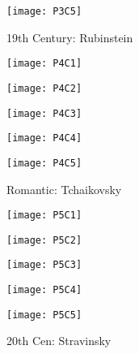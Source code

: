\begin{figure}[h]
\caption{19th Century: Rubinstein}
\centering
\texttt{[image: P3C5]}
\end{figure}

\begin{figure}
\centering
\begin{minipage}{.5\textwidth}
  \centering
  \texttt{[image: P4C1]}
  \label{fig:test1}
\end{minipage}%
\begin{minipage}{.5\textwidth}
  \centering
  \texttt{[image: P4C2]}
  \label{fig:test2}
\end{minipage}
\end{figure}

\begin{figure}
\centering
\begin{minipage}{.5\textwidth}
  \centering
  \texttt{[image: P4C3]}
  \label{fig:test1}
\end{minipage}%
\begin{minipage}{.5\textwidth}
  \centering
  \texttt{[image: P4C4]}
  \label{fig:test2}
\end{minipage}
\end{figure}

\begin{figure}[h]
\caption{Romantic: Tchaikovsky}
\centering
\texttt{[image: P4C5]}
\end{figure}

\begin{figure}
\centering
\begin{minipage}{.5\textwidth}
  \centering
  \texttt{[image: P5C1]}
  \label{fig:test1}
\end{minipage}%
\begin{minipage}{.5\textwidth}
  \centering
  \texttt{[image: P5C2]}
  \label{fig:test2}
\end{minipage}
\end{figure}

\begin{figure}
\centering
\begin{minipage}{.5\textwidth}
  \centering
  \texttt{[image: P5C3]}
  \label{fig:test1}
\end{minipage}%
\begin{minipage}{.5\textwidth}
  \centering
  \texttt{[image: P5C4]}
  \label{fig:test2}
\end{minipage}
\end{figure}

\begin{figure}[h]
\caption{20th Cen: Stravinsky}
\centering
\texttt{[image: P5C5]}
\end{figure}